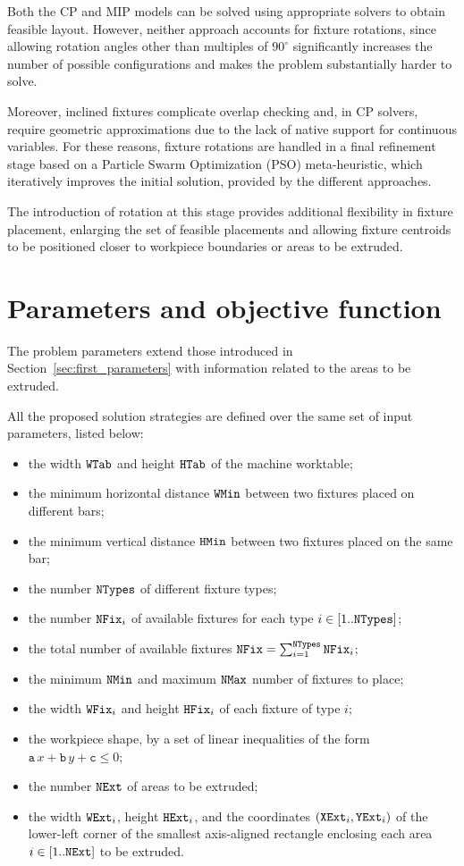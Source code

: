 Both the CP and MIP models can be solved using appropriate solvers to obtain feasible layout. However, neither approach accounts for fixture rotations, since allowing rotation angles other than multiples of $90^\circ$ significantly increases the number of possible configurations and makes the problem substantially harder to solve.

Moreover, inclined fixtures complicate overlap checking and, in CP solvers, require geometric approximations due to the lack of native support for continuous variables. For these reasons, fixture rotations are handled in a final refinement stage based on a Particle Swarm Optimization (PSO) meta-heuristic, which iteratively improves the initial solution, provided by the different approaches.

The introduction of rotation at this stage provides additional flexibility in fixture placement, enlarging the set of feasible placements and allowing fixture centroids to be positioned closer to workpiece boundaries or areas to be extruded.

\section{Parameters and objective function}
\label{sec:second_parameters}
The problem parameters extend those introduced in Section~\ref{sec:first_parameters} with information related to the areas to be extruded. 

All the proposed solution strategies are defined over the same set of input parameters, listed below:

\begin{itemize}
	\item the width $\mathtt{WTab}$ and height $\mathtt{HTab}$ of the machine worktable;
	\item the minimum horizontal distance $\mathtt{WMin}$ between two fixtures placed on different bars;
	\item the minimum vertical distance $\mathtt{HMin}$ between two fixtures placed on the same bar;
	\item the number $\mathtt{NTypes}$ of different fixture types;
	\item the number $\mathtt{NFix}_i$ of available fixtures for each type $i \in [1..\mathtt{NTypes}]$;
	\item the total number of available fixtures $\mathtt{NFix} = \sum_{i=1}^{\mathtt{NTypes}} \mathtt{NFix}_i$;
	\item the minimum $\mathtt{NMin}$ and maximum $\mathtt{NMax}$ number of fixtures to place;
	\item the width $\mathtt{WFix}_i$ and height $\mathtt{HFix}_i$ of each fixture of type $i$;
	\item the workpiece shape, by a set of linear inequalities of the form $\mathtt{a}\,x + \mathtt{b}\,y + \mathtt{c} \leq 0$;
	\item the number $\mathtt{NExt}$ of areas to be extruded;
	\item the width $\mathtt{WExt}_i$, height $\mathtt{HExt}_i$, and the coordinates $(\mathtt{XExt}_i, \mathtt{YExt}_i)$ of the lower-left corner of the smallest axis-aligned rectangle enclosing each area $i \in [1..\mathtt{NExt}]$ to be extruded.
\end{itemize}

